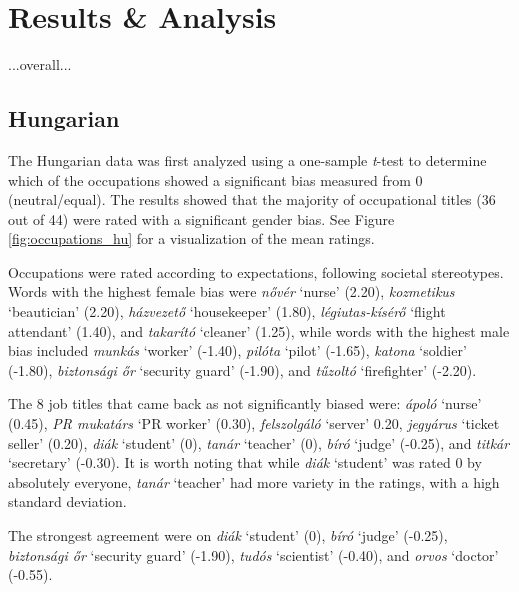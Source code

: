 \documentclass[11pt]{article}
\begin{document}

\section{Results \& Analysis}

...overall...

\subsection{Hungarian}

The Hungarian data was first analyzed using a one-sample \textit{t}-test to determine which of the occupations showed a significant bias measured from 0 (neutral/equal). The results showed that the majority of occupational titles (36 out of 44) were rated with a significant gender bias. See Figure \ref{fig:occupations_hu} for a visualization of the mean ratings.

Occupations were rated according to expectations, following societal stereotypes. Words with the highest female bias were \textit{nővér} `nurse' (2.20), \textit{kozmetikus} `beautician' (2.20), \textit{házvezető} `housekeeper' (1.80), \textit{légiutas-kísérő} `flight attendant' (1.40), and \textit{takarító} `cleaner' (1.25), while words with the highest male bias included \textit{munkás} `worker' (-1.40), \textit{pilóta} `pilot' (-1.65), \textit{katona} `soldier' (-1.80), \textit{biztonsági őr} `security guard' (-1.90), and \textit{tűzoltó} `firefighter' (-2.20).

The 8 job titles that came back as not significantly biased were: \textit{ápoló} `nurse' (0.45), \textit{PR mukatárs} `PR worker' (0.30), \textit{felszolgáló} `server' 0.20, \textit{jegyárus} `ticket seller' (0.20), \textit{diák} `student' (0), \textit{tanár} `teacher' (0), \textit{bíró} `judge' (-0.25), and \textit{titkár} `secretary' (-0.30). It is worth noting that while \textit{diák} `student' was rated 0 by absolutely everyone, \textit{tanár} `teacher' had more variety in the ratings, with a high standard deviation.

The strongest agreement were on \textit{diák} `student' (0), \textit{bíró} `judge' (-0.25), \textit{biztonsági őr} `security guard' (-1.90), \textit{tudós} `scientist' (-0.40), and \textit{orvos} `doctor' (-0.55).
\end{document}
